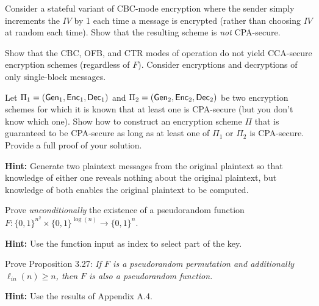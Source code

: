 \documentclass[a4paper,10pt,landscape,twocolumn]{scrartcl}
\begin{document}
\begin{exercise}
  Consider a stateful variant of CBC-mode encryption where the sender simply increments the $IV$ by 1 each time a message is encrypted (rather than choosing $IV$ at random each time). Show that the resulting scheme is \emph{not} CPA-secure.
\end{exercise}

\begin{exercise}
Show that the CBC, OFB, and CTR modes of operation do not yield CCA-secure encryption schemes (regardless of $F$). Consider encryptions and decryptions of only single-block messages.
\end{exercise}

\begin{exercise}
  Let $\Pi_1 = (\mathsf{Gen}_1,\mathsf{Enc}_1, \mathsf{Dec}_1)$ and $\Pi_2 = (\mathsf{Gen}_2,\mathsf{Enc}_2, \mathsf{Dec}_2)$ be two encryption schemes for which it is known that at least one is CPA-secure (but you don't know which one). Show how to construct an encryption scheme $\Pi$ that is guaranteed to be CPA-secure as long as at least one of $\Pi_1$ or $\Pi_2$ is CPA-secure. Provide a full proof of your solution.

  \textbf{Hint:} Generate two plaintext messages from the original plaintext so that knowledge of either one reveals nothing about the original plaintext, but knowledge of both enables the original plaintext to be computed.
\end{exercise}





\begin{bonusexercise}
  Prove \emph{unconditionally} the existence of a pseudorandom function $F : \{0,1\}^{n^2} \times \{0,1\}^{\log(n)} \to \{0,1\}^n$.

  \textbf{Hint:} Use the function input as index to select part of the key.
\end{bonusexercise}

\begin{bonusexercise}
  Prove Proposition 3.27:
  \textit{
If $F$ is a pseudorandom permutation and additionally $\ell_{in}(n) \geq n$, then $F$ is also a pseudorandom function.
  }

\textbf{Hint:} Use the results of Appendix A.4.
\end{bonusexercise}
\end{document}
